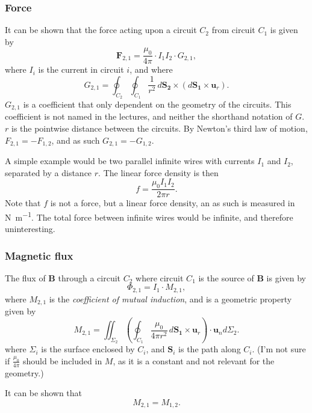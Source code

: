 \documentclass[a4paper, 12pt]{article}
\renewcommand{\vec}[1]{\mathbf{#1}}
\newcommand{\B}{\ensuremath{\vec{B}}}
\begin{document}
        \subsubsection{Force}
            It can be shown that the force acting upon a circuit $C_2$ from circuit $C_1$ is given by
            \begin{equation}
                \vec{F}_{2,1} = \frac{\mu_0}{4\pi}\cdot I_1 I_2 \cdot G_{2,1},
            \end{equation}
            where $I_i$ is the current in circuit $i$, and where 
            \begin{equation}
                G_{2,1} = \oint_{C_2} \oint_{C_1} \frac{1}{r^2}\,d\vec{S_2}\times\left(d\vec{S_1} \times \vec{u}_r\right).
            \end{equation}
            $G_{2,1}$ is a coefficient that only dependent on the geometry of the circuits. 
            This coefficient is not named in the lectures, and neither the shorthand notation of $G$.
            $r$ is the pointwise distance between the circuits. By Newton's third law of motion, $F_{2,1} = -F_{1,2}$, and as such $G_{2,1} = - G_{1,2}$.

            A simple example would be two parallel infinite wires with currents $I_1$ and $I_2$, separated by a distance $r$. The linear force density is then
            \begin{equation}
                f = \frac{\mu_0 I_1 I_2}{2\pi r}.
            \end{equation}
            Note that $f$ is not a force, but a linear force density, an as such is measured in \si{\newton\per\metre}. The total force between infinite wires would be infinite, and therefore uninteresting.
        \subsubsection{Magnetic flux}
            The flux of \B{} through a circuit $C_2$ where circuit $C_1$ is the source of \B{} is given by
            \begin{equation}
                \Phi_{2,1} = I_1 \cdot M_{2,1},
            \end{equation}
            where $M_{2,1}$ is the \textit{coefficient of mutual induction}, and is a geometric property given by
            \begin{equation}
                M_{2,1} = \iint_{\Sigma_2} \left(\oint_{C_1}\frac{\mu_0}{4\pi r^2}\,d\vec{S_1}\times \vec{u}_r \right)\cdot \vec{u}_n d\Sigma_2.
            \end{equation}
            where $\Sigma_i$ is the surface enclosed by $C_i$, and $\vec{S}_i$ is the path along $C_i$.
            (I'm not sure if $\frac{\mu_0}{4\pi}$ should be included in $M$, as it is a constant and not relevant for the geometry.)

            It can be shown that 
            \begin{equation}
                M_{2,1} = M_{1,2}.
            \end{equation}
\end{document}
